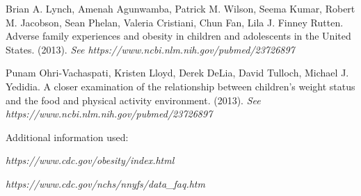 \documentclass[twoside,11pt]{article}
\begin{document}
Brian A. Lynch, Amenah Agunwamba, Patrick M. Wilson, Seema Kumar, Robert M. Jacobson, Sean Phelan, Valeria Cristiani, Chun Fan, Lila J. Finney Rutten. Adverse family experiences and obesity in children and adolescents in
the United States. (2013).
{\noindent \em See https://www.ncbi.nlm.nih.gov/pubmed/23726897}

Punam Ohri-Vachaspati, Kristen Lloyd, Derek DeLia, David Tulloch, Michael J. Yedidia. A closer examination of the relationship between children's weight status and the food and physical activity environment. (2013).
{\noindent \em See https://www.ncbi.nlm.nih.gov/pubmed/23726897}

Additional information used:

{\noindent \em https://www.cdc.gov/obesity/index.html}

{\noindent \em https://www.cdc.gov/nchs/nnyfs/data_faq.htm}
\end{document}
